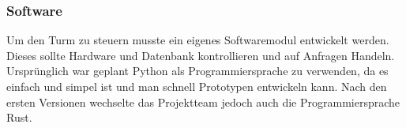 \subsubsection{Software}

Um den Turm zu steuern musste ein eigenes Softwaremodul entwickelt werden. Dieses sollte Hardware und Datenbank kontrollieren und auf Anfragen Handeln. Ursprünglich war geplant Python als Programmiersprache zu verwenden, da es einfach und simpel ist und man schnell Prototypen entwickeln kann. Nach den ersten Versionen wechselte das Projektteam jedoch auch die Programmiersprache Rust.

\clearpage


\clearpage


\clearpage


\clearpage


